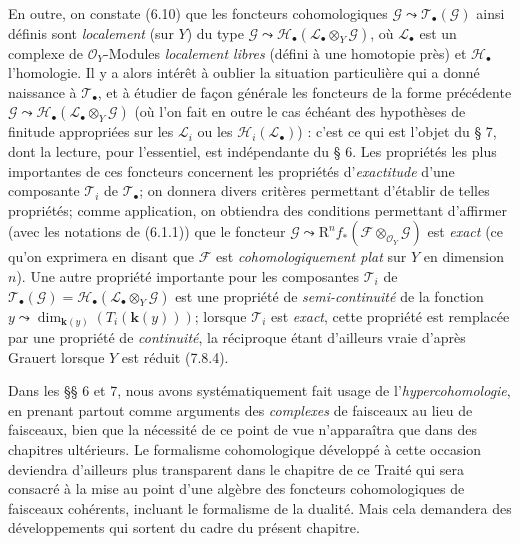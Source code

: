 \begin{env}[6.1.2]
En outre, on constate (6.10) que les foncteurs cohomologiques
$\mathscr G\leadsto\mathscr T_\bullet(\mathscr G)$ ainsi définis sont
\emph{localement} (sur $Y$) du type
$\mathscr G\leadsto\mathscr H_\bullet(\mathscr L_\bullet\otimes_Y\mathscr G)$,
où $\mathscr L_\bullet$ est un complexe de $\mathscr O_Y$-Modules \emph{localement
libres} (défini à une homotopie près) et $\mathscr H_\bullet$ l'homologie. Il y
a alors intérêt à oublier la situation particulière qui a donné naissance à
$\mathscr T_\bullet$, et à étudier de
façon générale les foncteurs de la forme précédente
$\mathscr G\leadsto\mathscr H_\bullet(\mathscr L_\bullet\otimes_Y\mathscr G)$
(où l'on fait en outre le cas échéant des hypothèses de finitude appropriées
sur les $\mathscr L_i$ ou les $\mathscr H_i(\mathscr L_\bullet)$) : c'est ce
qui est l'objet du § 7, dont la lecture, pour l'essentiel, est indépendante du
§ 6. Les propriétés les plus importantes de ces foncteurs concernent les
propriétés d'\emph{exactitude} d'une composante $\mathscr T_i$ de
$\mathscr T_\bullet$; on donnera divers critères permettant d'établir de
telles propriétés; comme application, on obtiendra des conditions permettant
d'affirmer (avec les notations de (6.1.1)) que le foncteur
$\mathscr G\leadsto\mathrm R^n f_*(\mathscr F\otimes_{\mathscr O_Y}\mathscr G)$
est \emph{exact} (ce qu'on exprimera en disant que $\mathscr F$ est
\emph{cohomologiquement plat} sur $Y$ en dimension $n$). Une autre propriété
importante pour les composantes $\mathscr T_i$ de
$\mathscr T_\bullet(\mathscr G)=
\mathscr H_\bullet(\mathscr L_\bullet\otimes_Y\mathscr G)$ est une propriété
de \emph{semi-continuité} de la fonction
$y\leadsto\dim_{\boldsymbol{k}(y)}(T_i(\boldsymbol{k}(y)))$; lorsque $\mathscr T_i$ est \emph{exact}, cette
propriété est remplacée par une propriété de \emph{continuité}, la réciproque étant
d'ailleurs vraie d'après Grauert lorsque $Y$ est réduit (7.8.4).
\end{env}

\begin{env}[6.1.3]
Dans les §§ 6 et 7, nous avons systématiquement fait usage de
l'\emph{hypercohomologie}, en prenant partout comme arguments des \emph{complexes} de
faisceaux au lieu de faisceaux, bien que la nécessité de ce point de vue
n'apparaîtra que dans des chapitres ultérieurs. Le formalisme cohomologique
développé à cette occasion deviendra d'ailleurs plus transparent dans le
chapitre de ce Traité qui sera consacré à la mise au point d'une algèbre des
foncteurs cohomologiques de faisceaux cohérents, incluant le formalisme de la
dualité. Mais cela demandera des développements qui sortent du cadre du
présent chapitre.
\end{env}

